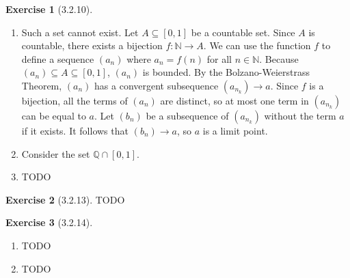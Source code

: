 \documentclass{amsart}
\theoremstyle{definition}
\newtheorem{exercise}{Exercise}
\newcommand{\N}{\mathbb{N}}
\newcommand{\Q}{\mathbb{Q}}
\begin{document}
\begin{exercise}[3.2.10]
  \begin{enumerate}[label={(\roman*)}]
    \item Such a set cannot exist. Let $A \subseteq [0, 1]$ be a countable set.
      Since $A$ is countable, there exists a bijection $f : \N \to A$. We can
      use the function $f$ to define a sequence $(a_n)$ where $a_n = f(n)$ for
      all $n \in \N$. Because $(a_n) \subseteq A \subseteq [0, 1]$, $(a_n)$ is
      bounded. By the Bolzano-Weierstrass Theorem, $(a_n)$ has a convergent
      subsequence $(a_{n_k}) \to a$. Since $f$ is a bijection, all the terms of
      $(a_n)$ are distinct, so at most one term in $(a_{n_k})$ can be equal to
      $a$. Let $(b_n)$ be a subsequence of $(a_{n_k})$ without the term $a$ if
      it exists. It follows that $(b_n) \to a$, so $a$ is a limit point.
    \item Consider the set $\Q \cap [0, 1]$.
    \item TODO
  \end{enumerate}
\end{exercise}

\begin{exercise}[3.2.13]
  TODO
\end{exercise}

\begin{exercise}[3.2.14]
  \begin{enumerate}[label={(\alph*)}]
    \item TODO
    \item TODO
  \end{enumerate}
\end{exercise}
\end{document}
